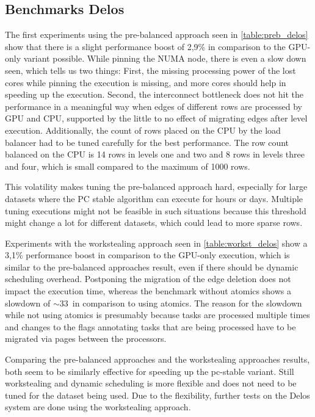 \subsection{Benchmarks Delos}

The first experiments using the pre-balanced approach seen in \ref{table:preb_delos} show that there is a slight performance boost of 2,9\% in comparison to the GPU-only variant possible. While pinning the NUMA node, there is even a slow down seen, which tells us two things: First, the missing processing power of the lost cores while pinning the execution is missing, and more cores should help in speeding up the execution. Second, the interconnect bottleneck does not hit the performance in a meaningful way when edges of different rows are processed by GPU and CPU, supported by the little to no effect of migrating edges after level execution. Additionally, the count of rows placed on the CPU by the load balancer had to be tuned carefully for the best performance. The row count balanced on the CPU is 14 rows in levels one and two and 8 rows in levels three and four, which is small compared to the maximum of 1000 rows.

This volatility makes tuning the pre-balanced approach hard, especially for large datasets where the PC stable algorithm can execute for hours or days. Multiple tuning executions might not be feasible in such situations because this threshold might change a lot for different datasets, which could lead to more sparse rows.


Experiments with the workstealing approach seen in \ref{table:workst_delos} show a 3,1\% performance boost in comparison to the GPU-only execution, which is similar to the pre-balanced approaches result, even if there should be dynamic scheduling overhead. Postponing the migration of the edge deletion does not impact the execution time, whereas the benchmark without atomics shows a slowdown of $\sim$33\ in comparison to using atomics. The reason for the slowdown while not using atomics is presumably because tasks are processed multiple times and changes to the flags annotating tasks that are being processed have to be migrated via pages between the processors.

Comparing the pre-balanced approaches and the workstealing approaches results, both seem to be similarly effective for speeding up the pc-stable variant. Still workstealing and dynamic scheduling is more flexible and does not need to be tuned for the dataset being used. Due to the flexibility, further tests on the Delos system are done using the workstealing approach.

